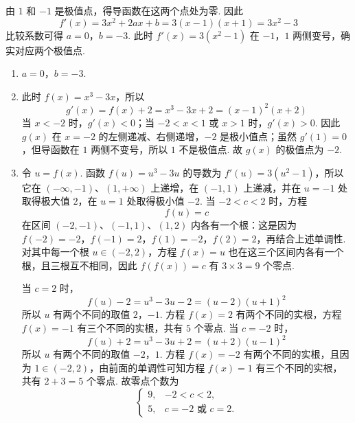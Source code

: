\begin{solution}
由 \(1\) 和 \(-1\) 是极值点，得导函数在这两个点处为零. 因此
\[
f'(x)=3x^2+2ax+b=3(x-1)(x+1)=3x^2-3
\]
比较系数可得 \(a=0\)，\(b=-3\). 此时 \(f'(x)=3(x^2-1)\) 在 \(-1\)，\(1\) 两侧变号，确实对应两个极值点.

\begin{enumerate}
\item \(a=0\)，\(b=-3\).

\item 此时 \(f(x)=x^3-3x\)，所以
\[
g'(x)=f(x)+2=x^3-3x+2=(x-1)^2(x+2)
\]
当 \(x<-2\) 时，\(g'(x)<0\)；当 \(-2<x<1\) 或 \(x>1\) 时，\(g'(x)>0\). 因此 \(g(x)\) 在 \(x=-2\) 的左侧递减、右侧递增，\(-2\) 是极小值点；虽然 \(g'(1)=0\)，但导函数在 \(1\) 两侧不变号，所以 \(1\) 不是极值点. 故 \(g(x)\) 的极值点为 \(-2\).

\item 令 \(u=f(x)\). 函数 \(f(u)=u^3-3u\) 的导数为 \(f'(u)=3(u^2-1)\)，所以它在 \((-\infty,-1)\)、\((1,+\infty)\) 上递增，在 \((-1,1)\) 上递减，并在 \(u=-1\) 处取得极大值 \(2\)，在 \(u=1\) 处取得极小值 \(-2\). 当 \(-2<c<2\) 时，方程
\[
f(u)=c
\]
在区间 \((-2,-1)\)、\((-1,1)\)、\((1,2)\) 内各有一个根：这是因为 \(f(-2)=-2\)，\(f(-1)=2\)，\(f(1)=-2\)，\(f(2)=2\)，再结合上述单调性. 对其中每一个根 \(u\in(-2,2)\)，方程 \(f(x)=u\) 也在这三个区间内各有一个根，且三根互不相同，因此 \(f(f(x))=c\) 有 \(3\times3=9\) 个零点.

当 \(c=2\) 时，
\[
f(u)-2=u^3-3u-2=(u-2)(u+1)^2
\]
所以 \(u\) 有两个不同的取值 \(2\)，\(-1\). 方程 \(f(x)=2\) 有两个不同的实根，方程 \(f(x)=-1\) 有三个不同的实根，共有 \(5\) 个零点. 当 \(c=-2\) 时，
\[
f(u)+2=u^3-3u+2=(u+2)(u-1)^2
\]
所以 \(u\) 有两个不同的取值 \(-2\)，\(1\). 方程 \(f(x)=-2\) 有两个不同的实根，且因为 \(1\in(-2,2)\)，由前面的单调性可知方程 \(f(x)=1\) 有三个不同的实根，共有 \(2+3=5\) 个零点. 故零点个数为
\[
\begin{cases}
9,&-2<c<2,\\
5,&c=-2\text{ 或 }c=2.
\end{cases}
\]
\end{enumerate}
\end{solution}

